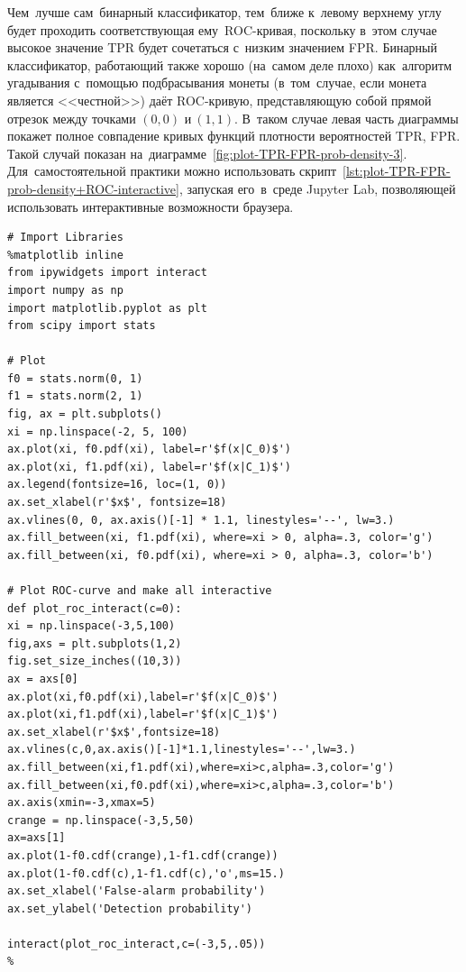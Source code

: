 \documentclass[]{scrreprt}
\begin{document}
Чем~лучше сам~бинарный классификатор, тем~ближе к~левому верхнему углу будет проходить соответствующая ему~ROC-кривая, поскольку в~этом случае высокое значение TPR будет сочетаться с~низким значением FPR. Бинарный классификатор, работающий также хорошо (на~самом деле плохо) как~алгоритм угадывания с~помощью подбрасывания монеты (в~том~случае, если монета является <<честной>>) даёт ROC-кривую, представляющую собой прямой отрезок между точками $(0,0)$ и$~(1,1)$. В~таком случае левая часть диаграммы покажет полное совпадение кривых функций плотности вероятностей TPR, FPR. Такой случай показан на~диаграмме~\ref{fig:plot-TPR-FPR-prob-density-3}. Для~самостоятельной практики можно использовать скрипт~\ref{lst:plot-TPR-FPR-prob-density+ROC-interactive}, запуская его~в~среде Jupyter Lab, позволяющей использовать интерактивные возможности браузера.
%
\begin{lstlisting}[float, caption = Построение интерактивной диаграммы плотности распределения TPR и~FPR и~соответствующей ей~ROC кривой для~заданного порогового значения, firstnumber=1, label= lst:plot-TPR-FPR-prob-density+ROC-interactive]
# Import Libraries
%matplotlib inline
from ipywidgets import interact
import numpy as np
import matplotlib.pyplot as plt
from scipy import stats

# Plot
f0 = stats.norm(0, 1)
f1 = stats.norm(2, 1)
fig, ax = plt.subplots()
xi = np.linspace(-2, 5, 100)
ax.plot(xi, f0.pdf(xi), label=r'$f(x|C_0)$')
ax.plot(xi, f1.pdf(xi), label=r'$f(x|C_1)$')
ax.legend(fontsize=16, loc=(1, 0))
ax.set_xlabel(r'$x$', fontsize=18)
ax.vlines(0, 0, ax.axis()[-1] * 1.1, linestyles='--', lw=3.)
ax.fill_between(xi, f1.pdf(xi), where=xi > 0, alpha=.3, color='g')
ax.fill_between(xi, f0.pdf(xi), where=xi > 0, alpha=.3, color='b')

# Plot ROC-curve and make all interactive
def plot_roc_interact(c=0):
xi = np.linspace(-3,5,100)
fig,axs = plt.subplots(1,2)
fig.set_size_inches((10,3))
ax = axs[0]
ax.plot(xi,f0.pdf(xi),label=r'$f(x|C_0)$')
ax.plot(xi,f1.pdf(xi),label=r'$f(x|C_1)$')
ax.set_xlabel(r'$x$',fontsize=18)
ax.vlines(c,0,ax.axis()[-1]*1.1,linestyles='--',lw=3.)
ax.fill_between(xi,f1.pdf(xi),where=xi>c,alpha=.3,color='g')
ax.fill_between(xi,f0.pdf(xi),where=xi>c,alpha=.3,color='b')
ax.axis(xmin=-3,xmax=5)
crange = np.linspace(-3,5,50)
ax=axs[1]
ax.plot(1-f0.cdf(crange),1-f1.cdf(crange))
ax.plot(1-f0.cdf(c),1-f1.cdf(c),'o',ms=15.)
ax.set_xlabel('False-alarm probability')
ax.set_ylabel('Detection probability')

interact(plot_roc_interact,c=(-3,5,.05))
%
\end{lstlisting}
\end{document}

